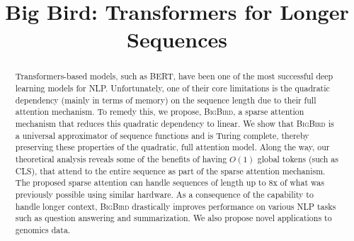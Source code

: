 \title{Big Bird: Transformers for Longer Sequences}

\begin{abstract}
Transformers-based models, such as BERT, have been one of the most successful deep learning models for NLP. Unfortunately, one of their core limitations is the quadratic dependency (mainly in terms of memory) on the sequence length due to their full attention mechanism.  To remedy this, we propose, \textsc{BigBird}, a sparse attention mechanism that reduces this quadratic dependency to linear.  We show that \textsc{BigBird} is a universal approximator of sequence functions and is Turing complete, thereby preserving these  properties of the quadratic, full attention model. Along the way, our theoretical analysis reveals  some of the benefits of having $O(1)$ global tokens (such as CLS), that attend to the entire sequence  as part of the sparse attention mechanism. The proposed sparse attention can handle sequences of length up to 8x of  what was previously possible using  similar hardware.  As a consequence of the capability to handle longer context, \textsc{BigBird}  drastically improves performance  on various NLP tasks  such as question answering and summarization. We also propose novel applications to genomics data.
\end{abstract}

